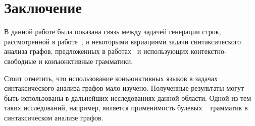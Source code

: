 \section{Заключение}

В данной работе была показана связь между задачей генерации строк, рассмотренной в работе~\cite{azimov-spbu-Okhotin}, и некоторыми вариациями задачи синтаксического анализа графов, предложенных в работах~\cite{azimov-spbu-hellings1, azimov-spbu-hellings2} и использующих контекстно-свободные и конъюнктивные грамматики.

Стоит отметить, что использование конъюнктивных языков в задачах синтаксического анализа графов мало изучено. Полученные результаты могут быть использованы в дальнейших исследованиях данной области. Одной из тем таких исследований, например, является применимость булевых ~\cite{azimov-spbu-bool, azimov-spbu-conjandbool} грамматик в синтаксическом анализе графов.